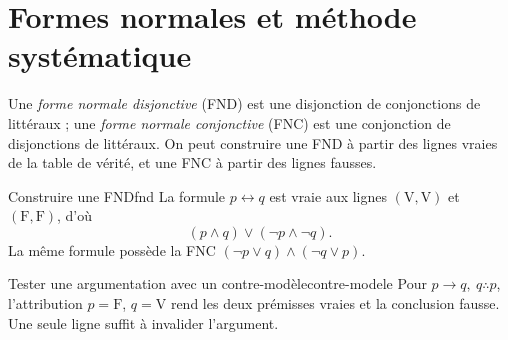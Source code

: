 \section{Formes normales et méthode systématique}
Une \emph{forme normale disjonctive} (FND) est une disjonction de conjonctions de littéraux ; une \emph{forme normale conjonctive} (FNC) est une conjonction de disjonctions de littéraux. On peut construire une FND à partir des lignes vraies de la table de vérité, et une FNC à partir des lignes fausses.
\begin{exemple}{Construire une FND}{fnd}
La formule $p\leftrightarrow q$ est vraie aux lignes $(\mathrm V,\mathrm V)$ et $(\mathrm F,\mathrm F)$, d'où
\[(p\wedge q)\vee(\neg p\wedge\neg q).\]
La même formule possède la FNC $(\neg p\vee q)\wedge(\neg q\vee p)$.
\end{exemple}
\begin{exemple}{Tester une argumentation avec un contre-modèle}{contre-modele}
Pour $p\to q,\ q\therefore p$, l'attribution $p=\mathrm F$, $q=\mathrm V$ rend les deux prémisses vraies et la conclusion fausse. Une seule ligne suffit à invalider l'argument.
\end{exemple}

